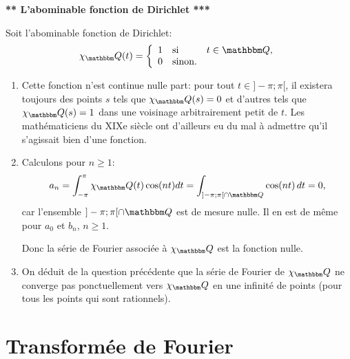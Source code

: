 \begin{exercice} 

\begin{center}
{\bf *** L'abominable fonction de Dirichlet ***} 
\end{center}
 
Soit l'abominable fonction de Dirichlet:
\[
  \chi_\eQ(t) = \left \{ \begin{array}{llr} 
  1 & \mbox{si }& t\in \eQ,\\
  0 & \mbox{sinon.}
  \end{array}\right.
\]

\begin{enumerate}
 \item Cette fonction n'est continue nulle part: pour tout $t\in]-\pi;\pi[$, il existera toujours des points $s$ tels que $\chi_\eQ(s)=0$ et d'autres tels que $\chi_\eQ(s)=1$ dans une voisinage arbitrairement petit de $t$.
 Les mathématiciens du XIXe siècle ont d'ailleurs eu du mal à admettre qu'il s'agissait bien d'une fonction.
  
 \item Calculons pour $n\geq1$:
 \[
  a_n = \int_{-\pi}^\pi \chi_\eQ (t) \cos(nt) dt = \int_{]-\pi;\pi[ \cap \eQ} \cos(nt) \, dt = 0,
 \]
 car l'ensemble $]-\pi;\pi[ \cap \eQ$ est de mesure nulle. Il en est de même pour $a_0$ et $b_n$, $n\geq1$.
 
 Donc la série de Fourier associée à $\chi_\eQ$ est la fonction nulle.
 
 \item On déduit de la question précédente que la série de Fourier de $\chi_\eQ$ ne converge pas ponctuellement vers $\chi_\eQ$ en une infinité de points (pour tous les points qui sont rationnels).
\end{enumerate}

\end{exercice}

\newpage

\section{Transformée de Fourier}

